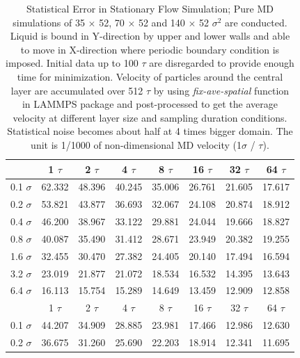 \documentclass[preprint,12pt]{elsarticle}
\begin{document}
\begin{table}
  \caption{\small Statistical Error in Stationary Flow Simulation; Pure MD simulations of 35 $\times$ 52, 70 $\times$ 52 and 140 $\times$ 52 ${\sigma}^2$ are conducted. Liquid is bound in Y-direction by upper and lower walls and able to move in X-direction where periodic boundary condition is imposed. Initial data up to 100 $\tau$ are disregarded to provide enough time for minimization. Velocity of particles around the central layer are accumulated over 512 $\tau$ by using {\it{fix-ave-spatial}} function in LAMMPS package and post-processed to get the average velocity at different layer size and sampling duration conditions. Statistical noise becomes about half at 4 times bigger domain. The unit is 1/1000 of non-dimensional MD velocity (1$\sigma$ / $\tau$).}
  \label{table:MD_Vel0}
  \centering
  \resizebox{0.8\linewidth}{!} {
  \begin{tabular}{c || c c c c c c c}
\hline
	&	1 $\tau$	&	2 $\tau$	&	4 $\tau$	&	8 $\tau$	&	16 $\tau$	 &	32 $\tau$	&	64 $\tau$	\\
\hline
0.1 $\sigma$	&	62.332 	&	48.396 	&	40.245 	&	35.006 	&	26.761 	&	 21.605 	&	17.617 	\\
0.2 $\sigma$	&	53.821 	&	43.877 	&	36.693 	&	32.067 	&	24.108 	&	 20.874 	&	18.912 	\\
0.4 $\sigma$	&	46.200 	&	38.967 	&	33.122 	&	29.881 	&	24.044 	&	 19.666 	&	18.827 	\\
0.8 $\sigma$	&	40.087 	&	35.490 	&	31.412 	&	28.671 	&	23.949 	&	 20.382 	&	19.255 	\\
1.6 $\sigma$	&	32.455 	&	30.470 	&	27.382 	&	24.405 	&	20.140 	&	 17.494 	&	16.594 	\\
3.2 $\sigma$	&	23.019 	&	21.877 	&	21.072 	&	18.534 	&	16.532 	&	 14.395 	&	13.643 	\\
6.4 $\sigma$	&	16.113 	&	15.754 	&	15.289 	&	14.649 	&	13.459 	&	 12.909 	&	12.858 	\\
\hline
\hline
	&	1 $\tau$	&	2 $\tau$	&	4 $\tau$	&	8 $\tau$	&	16 $\tau$	 &	32 $\tau$	&	64 $\tau$	\\
\hline
0.1 $\sigma$	&	44.207 	&	34.909 	&	28.885 	&	23.981 	&	17.466 	&	 12.986 	&	12.630 	\\
0.2 $\sigma$	&	36.675 	&	31.260 	&	25.690 	&	22.203 	&	18.914 	&	 12.341 	&	11.695 	\\

\end{tabular}}
\end{table}
\end{document}
